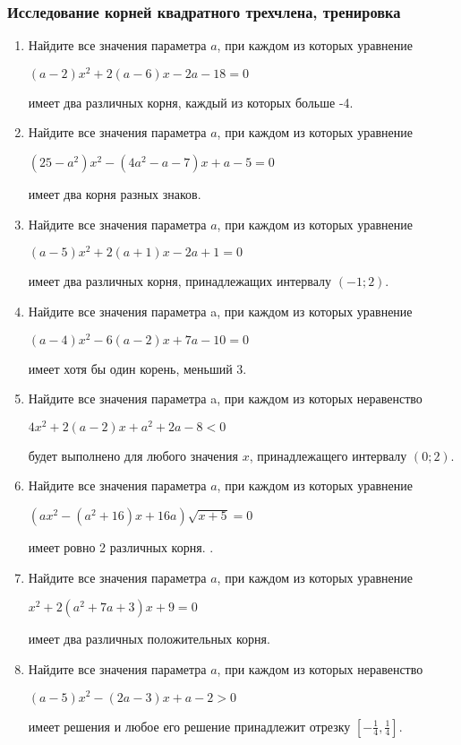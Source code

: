 \documentclass[12pt]{article}
\begin{document}
\subsubsection{Исследование корней квадратного трехчлена, тренировка}
 \begin{enumerate}[start=1,label={\itshape\bfseries \arabic*.}]
    \item Найдите все значения параметра $a$, при каждом из которых уравнение \begin{center}$(a - 2)x^2 +2(a - 6)x - 2a - 18 = 0 $\end{center}
    имеет два различных корня, каждый из которых больше -4.
    \item Найдите все значения параметра $a$, при каждом из которых уравнение \begin{center} $(25 - a^2)x^2 - (4a^2 - a - 7)x + a - 5=0$ \end{center} имеет два корня разных знаков.
    \item  Найдите все значения параметра $a$, при каждом из которых уравнение \begin{center}$(a - 5)x^2 + 2(a + 1)x - 2a + 1 = 0$ \end{center} имеет два различных корня, принадлежащих интервалу $(-1; 2)$.
    \item Найдите все значения параметра a, при каждом из которых уравнение \begin{center}$(a - 4)x^2 - 6(a - 2)x + 7a - 10 = 0$\end{center} имеет хотя бы один корень, меньший $3$.
    \item Найдите все значения параметра a, при каждом из которых неравенство \begin{center}$4x^2 + 2 (a - 2)x + a^2 + 2a - 8 < 0$\end{center} будет выполнено для любого значения $x$, принадлежащего интервалу $(0; 2)$.
     \item Найдите все значения параметра $a$, при каждом из которых уравнение \begin{center}
        $(ax^2 - (a^2 + 16)x + 16a)\sqrt{x + 5} = 0$
    \end{center}
    имеет ровно 2 различных корня. .
    \item Найдите все значения параметра $a$, при каждом из которых уравнение \begin{center}
        $x^2 + 2(a^2 + 7a + 3)x + 9 = 0$
    \end{center} имеет два различных положительных корня.
    \item Найдите все значения параметра $a$, при каждом из которых неравенство \begin{center} $(a - 5)x^2 - (2a - 3)x + a - 2 > 0 $\end{center} имеет решения и любое его решение принадлежит отрезку $[-\frac{1}{4}, \frac{1}{4}]$.

\end{enumerate}
\end{document}
